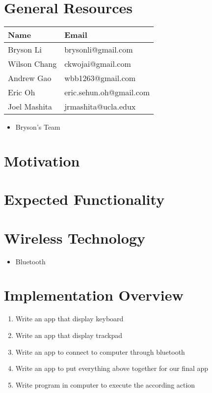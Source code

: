 \documentclass[11pt]{article}
\author{Wilson Chang}
\date{\today}
\title{}
\begin{document}
\tableofcontents

\section{General Resources}
\label{sec:org53f0f65}
\begin{center}
\begin{tabular}{ll}
Name & Email\\
\hline
Bryson Li & brysonli@gmail.com\\
Wilson Chang & ckwojai@gmail.com\\
Andrew Gao & wbb1263@gmail.com\\
Eric Oh & eric.sehun.oh@gmail.com\\
Joel Mashita & jrmashita@ucla.edux\\
\end{tabular}
\end{center}
\begin{itemize}
\item Bryson's Team
\end{itemize}
\section{Motivation}
\label{sec:org5452da1}
\section{Expected Functionality}
\label{sec:org349a520}
\section{Wireless Technology}
\label{sec:orgfd80471}
\begin{itemize}
\item Bluetooth
\end{itemize}
\section{Implementation Overview}
\label{sec:org8d8d735}
\begin{enumerate}
\item Write an app that display keyboard
\item Write an app that display trackpad
\item Write an app to connect to computer through bluetooth
\item Write an app to put everything above together for our final app
\item Write program in computer to execute the according action
\end{enumerate}
\end{document}
